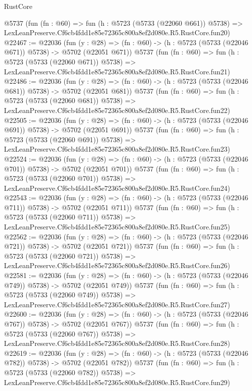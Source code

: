 \begin{lexlean}{RustCore}
\begin{coremodule}
    @5737
    (fun (fn : @60) =>
    fun (h : @5723 (@5733 (@22060 @661)) @5738) =>
    LexLeanPreserve.Cf6cb4fdd1e85e72365c800a8ef2d080e.R5.RustCore.fun20)
@22467 := @22036
    (fun (y : @28) => (fn : @60) -> (h : @5723 (@5733 (@22046 @671)) @5738) -> @5702 (@22051 @671))
    @5737
    (fun (fn : @60) =>
    fun (h : @5723 (@5733 (@22060 @671)) @5738) =>
    LexLeanPreserve.Cf6cb4fdd1e85e72365c800a8ef2d080e.R5.RustCore.fun21)
@22486 := @22036
    (fun (y : @28) => (fn : @60) -> (h : @5723 (@5733 (@22046 @681)) @5738) -> @5702 (@22051 @681))
    @5737
    (fun (fn : @60) =>
    fun (h : @5723 (@5733 (@22060 @681)) @5738) =>
    LexLeanPreserve.Cf6cb4fdd1e85e72365c800a8ef2d080e.R5.RustCore.fun22)
@22505 := @22036
    (fun (y : @28) => (fn : @60) -> (h : @5723 (@5733 (@22046 @691)) @5738) -> @5702 (@22051 @691))
    @5737
    (fun (fn : @60) =>
    fun (h : @5723 (@5733 (@22060 @691)) @5738) =>
    LexLeanPreserve.Cf6cb4fdd1e85e72365c800a8ef2d080e.R5.RustCore.fun23)
@22524 := @22036
    (fun (y : @28) => (fn : @60) -> (h : @5723 (@5733 (@22046 @701)) @5738) -> @5702 (@22051 @701))
    @5737
    (fun (fn : @60) =>
    fun (h : @5723 (@5733 (@22060 @701)) @5738) =>
    LexLeanPreserve.Cf6cb4fdd1e85e72365c800a8ef2d080e.R5.RustCore.fun24)
@22543 := @22036
    (fun (y : @28) => (fn : @60) -> (h : @5723 (@5733 (@22046 @711)) @5738) -> @5702 (@22051 @711))
    @5737
    (fun (fn : @60) =>
    fun (h : @5723 (@5733 (@22060 @711)) @5738) =>
    LexLeanPreserve.Cf6cb4fdd1e85e72365c800a8ef2d080e.R5.RustCore.fun25)
@22562 := @22036
    (fun (y : @28) => (fn : @60) -> (h : @5723 (@5733 (@22046 @721)) @5738) -> @5702 (@22051 @721))
    @5737
    (fun (fn : @60) =>
    fun (h : @5723 (@5733 (@22060 @721)) @5738) =>
    LexLeanPreserve.Cf6cb4fdd1e85e72365c800a8ef2d080e.R5.RustCore.fun26)
@22581 := @22036
    (fun (y : @28) => (fn : @60) -> (h : @5723 (@5733 (@22046 @749)) @5738) -> @5702 (@22051 @749))
    @5737
    (fun (fn : @60) =>
    fun (h : @5723 (@5733 (@22060 @749)) @5738) =>
    LexLeanPreserve.Cf6cb4fdd1e85e72365c800a8ef2d080e.R5.RustCore.fun27)
@22600 := @22036
    (fun (y : @28) => (fn : @60) -> (h : @5723 (@5733 (@22046 @767)) @5738) -> @5702 (@22051 @767))
    @5737
    (fun (fn : @60) =>
    fun (h : @5723 (@5733 (@22060 @767)) @5738) =>
    LexLeanPreserve.Cf6cb4fdd1e85e72365c800a8ef2d080e.R5.RustCore.fun28)
@22619 := @22036
    (fun (y : @28) => (fn : @60) -> (h : @5723 (@5733 (@22046 @782)) @5738) -> @5702 (@22051 @782))
    @5737
    (fun (fn : @60) =>
    fun (h : @5723 (@5733 (@22060 @782)) @5738) =>
    LexLeanPreserve.Cf6cb4fdd1e85e72365c800a8ef2d080e.R5.RustCore.fun29)

\end{coremodule}
\end{lexlean}
